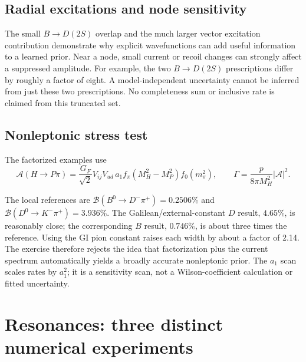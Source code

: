 \documentclass[11pt,a4paper]{article}
\newcommand{\BR}{\mathcal B}
\newcommand{\tab}[2]{\begin{table}[htbp]\centering\small\caption{#2}\end{table}}
\begin{document}
\subsection{Radial excitations and node sensitivity}
\tab{radial}{Radial-excitation branching fractions (dimensionless, not percent). Daughter masses are GI $2S$ eigenvalues. These are bare-state studies, not experimental resonance assignments.}
The small $B\to D(2S)$ overlap and the much larger vector excitation contribution demonstrate why explicit wavefunctions can add useful information to a learned prior. Near a node, small current or recoil changes can strongly affect a suppressed amplitude. For example, the two $B\to D(2S)$ prescriptions differ by roughly a factor of eight. A model-independent uncertainty cannot be inferred from just these two prescriptions. No completeness sum or inclusive rate is claimed from this truncated set.

\subsection{Nonleptonic stress test}
The factorized examples use
\begin{equation}
 \mathcal A(H\to P\pi)=\frac{G_F}{\sqrt2}V_{ij}V_{ud}\,a_1f_\pi
 (M_H^2-M_P^2)f_0(m_\pi^2),\qquad
 \Gamma=\frac{p}{8\pi M_H^2}|\mathcal A|^2.
\end{equation}
\tab{nonleptonic}{Branching fractions in percent at $a_1=1$. ``ext.'' uses $f_\pi=130.2$ MeV; ``GI'' uses the computed constant. The complete output also scans $a_1=0.9,1.1$.}
The local references are $\BR(B^0\to D^-\pi^+)=0.2506\%$ and $\BR(D^0\to K^-\pi^+)=3.936\%$. The Galilean/external-constant $D$ result, $4.65\%$, is reasonably close; the corresponding $B$ result, $0.746\%$, is about three times the reference. Using the GI pion constant raises each width by about a factor of 2.14. The exercise therefore rejects the idea that factorization plus the current spectrum automatically yields a broadly accurate nonleptonic prior. The $a_1$ scan scales rates by $a_1^2$; it is a sensitivity scan, not a Wilson-coefficient calculation or fitted uncertainty.

\section{Resonances: three distinct numerical experiments}
\end{document}
